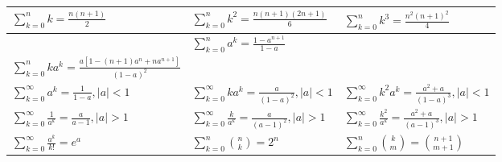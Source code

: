 \vspace{1em}
\bgroup
\def\arraystretch{3}
{\normalsize
  \begin{center}
    \begin{tabular}{| >{\centering}m{5cm}| >{\centering}m{5cm}| >{\centering}m{5cm}|}
      \hline
      $\sum_{k = 0}^n k = \frac{n(n + 1)}{2}$
       &
      $\sum_{k = 0}^n k^2 = \frac{n(n + 1)(2n + 1)}{6}$
       &
      $\sum_{k = 0}^n k^3 = \frac{n^2(n + 1)^2}{4}$
      \tabularnewline \hline
      \multicolumn{2}{|c|}{$\sum_{k = 0}^n k^4 = \frac{n}{30} (n + 1)(2n + 1)(3n^2 + 3n - 1)$}
       &
      $\sum_{k = 0}^n a^k = \frac{1 - a^{n + 1}}{1 - a}$
      \tabularnewline \hline
      $\sum_{k = 0}^n ka^k = \frac{a[1 - (n + 1)a^n + na^{n + 1}]}{(1 - a)^2}$
       &
      \multicolumn{2}{c|}{
      $\sum_{k = 0}^n k^2a^k = \frac{a[(1 + a) - (n + 1)^2a^n + (2n^2 + 2n - 1)a^{n + 1} - n^2a^{n + 2}]}{(1 - a)^3}$
      }
      \tabularnewline \hline
      $\sum_{k = 0}^\infty a^k = \frac{1}{1 - a}, |a| < 1$
       &
      $\sum_{k = 0}^\infty ka^k = \frac{a}{(1 - a)^2}, |a| < 1$
       &
      $\sum_{k = 0}^\infty k^2a^k = \frac{a^2 + a}{(1 - a)^3}, |a| < 1$
      \tabularnewline \hline
      $\sum_{k = 0}^\infty \frac{1}{a^k} = \frac{a}{a - 1}, |a| > 1$
       &
      $\sum_{k = 0}^\infty \frac{k}{a^k} = \frac{a}{(a - 1)^2}, |a| > 1$
       &
      $\sum_{k = 0}^\infty \frac{k^2}{a^k} = \frac{a^2 + a}{(a - 1)^3}, |a| > 1$
      \tabularnewline \hline
      $\sum_{k = 0}^\infty \frac{a^k}{k!} = e^a$
       &
      $\sum_{k = 0}^n \binom{n}{k} = 2^n$
       &
      $\sum_{k = 0}^n \binom{k}{m} = \binom{n + 1}{m + 1}$
      \tabularnewline \hline
    \end{tabular}
  \end{center}
}
\egroup
\vspace{1em}